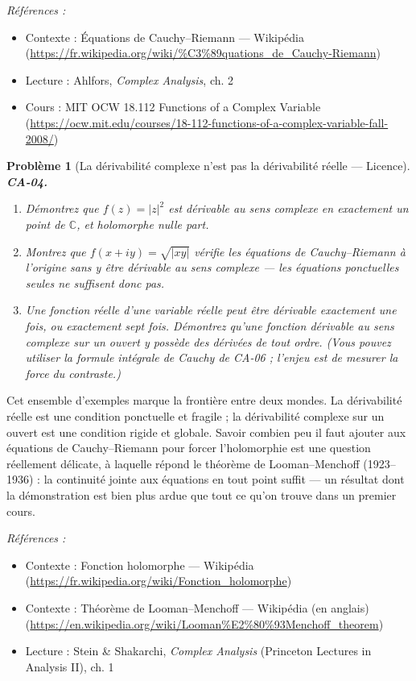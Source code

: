 \documentclass[11pt]{article}
\newtheorem{problem}{Problème}
\newenvironment{refs}{\par\small\noindent\emph{Références :}\begin{itemize}\setlength\itemsep{0pt}}{\end{itemize}\normalsize}
\begin{document}
\begin{refs}
\item Contexte : Équations de Cauchy--Riemann --- Wikipédia (\url{https://fr.wikipedia.org/wiki/%C3%89quations_de_Cauchy-Riemann})
\item Lecture : Ahlfors, \textit{Complex Analysis}, ch. 2
\item Cours : MIT OCW 18.112 Functions of a Complex Variable (\url{https://ocw.mit.edu/courses/18-112-functions-of-a-complex-variable-fall-2008/})
\end{refs}

\bigskip

\begin{problem}[{La dérivabilité complexe n'est pas la dérivabilité réelle --- Licence}]
\textbf{CA-04.} \begin{enumerate}
\item[(a)] Démontrez que $ f(z) = |z|^2 $ est dérivable au sens
complexe en exactement un point de $ \mathbb{C} $, et holomorphe nulle part.
\item[(b)] Montrez que $ f(x + iy) = \sqrt{|xy|} $ vérifie les équations de Cauchy--Riemann à
l'origine sans y être dérivable au sens complexe --- les équations ponctuelles seules ne suffisent
donc pas.
\item[(c)] Une fonction réelle d'une variable réelle peut être dérivable exactement une fois, ou
exactement sept fois. Démontrez qu'une fonction dérivable au sens complexe sur un ouvert y possède
des dérivées de tout ordre. (Vous pouvez utiliser la formule intégrale de Cauchy de CA-06 ; l'enjeu
est de mesurer la force du contraste.)
\end{enumerate}

\end{problem}

\noindent Cet ensemble d'exemples marque la frontière entre deux mondes. La dérivabilité
réelle est une condition ponctuelle et fragile ; la dérivabilité complexe sur un ouvert est une
condition rigide et globale. Savoir combien peu il faut ajouter aux équations de Cauchy--Riemann pour
forcer l'holomorphie est une question réellement délicate, à laquelle répond le théorème de
Looman--Menchoff (1923--1936) : la continuité jointe aux équations en tout point suffit --- un résultat
dont la démonstration est bien plus ardue que tout ce qu'on trouve dans un premier cours.

\begin{refs}
\item Contexte : Fonction holomorphe --- Wikipédia (\url{https://fr.wikipedia.org/wiki/Fonction_holomorphe})
\item Contexte : Théorème de Looman--Menchoff --- Wikipédia (en anglais) (\url{https://en.wikipedia.org/wiki/Looman%E2%80%93Menchoff_theorem})
\item Lecture : Stein \& Shakarchi, \textit{Complex Analysis} (Princeton Lectures in Analysis II), ch. 1
\end{refs}
\end{document}
